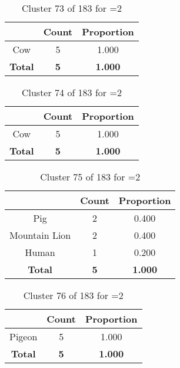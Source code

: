 \begin{table}[ht!]
\centering
\begin{tabular}{|c|c|c|}
\hline
\bf \Spec{} &\bf Count &\bf Proportion\\ \hline \hline
Cow & 5 & 1.000\\ \hline
\hline
\bf Total & \bf 5 & \bf 1.000\\ \hline
\end{tabular}
\label{tab:cluster:73:2}
\caption{Cluster 73 of 183 for \minneigh{}=2}
\end{table}

\begin{table}[ht!]
\centering
\begin{tabular}{|c|c|c|}
\hline
\bf \Spec{} &\bf Count &\bf Proportion\\ \hline \hline
Cow & 5 & 1.000\\ \hline
\hline
\bf Total & \bf 5 & \bf 1.000\\ \hline
\end{tabular}
\label{tab:cluster:74:2}
\caption{Cluster 74 of 183 for \minneigh{}=2}
\end{table}

\begin{table}[ht!]
\centering
\begin{tabular}{|c|c|c|}
\hline
\bf \Spec{} &\bf Count &\bf Proportion\\ \hline \hline
Pig & 2 & 0.400\\ \hline
Mountain Lion & 2 & 0.400\\ \hline
Human & 1 & 0.200\\ \hline
\hline
\bf Total & \bf 5 & \bf 1.000\\ \hline
\end{tabular}
\label{tab:cluster:75:2}
\caption{Cluster 75 of 183 for \minneigh{}=2}
\end{table}

\begin{table}[ht!]
\centering
\begin{tabular}{|c|c|c|}
\hline
\bf \Spec{} &\bf Count &\bf Proportion\\ \hline \hline
Pigeon & 5 & 1.000\\ \hline
\hline
\bf Total & \bf 5 & \bf 1.000\\ \hline
\end{tabular}
\label{tab:cluster:76:2}
\caption{Cluster 76 of 183 for \minneigh{}=2}
\end{table}

